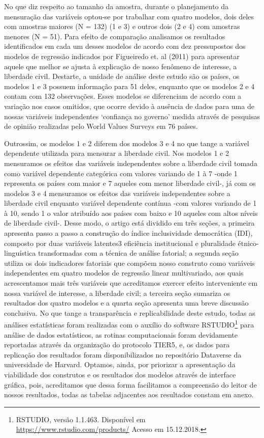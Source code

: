 \documentclass[]{elsarticle} %
\begin{document}
No que diz respeito ao tamanho da amostra, durante o planejamento da
mensuração das variáveis optou-se por trabalhar com quatro modelos, dois
deles com amostras maiores (N = 132) (1 e 3) e outros dois (2 e 4) com
amostras menores (N = 51). Para efeito de comparação analisamos os
resultados identificados em cada um desses modelos de acordo com dez
pressupostos dos modelos de regressão indicados por Figueiredo et. al
(2011) para apresentar aquele que melhor se ajusta à explicação de nosso
fenômeno de interesse, a liberdade civil. Destarte, a unidade de análise
deste estudo são os países, os modelos 1 e 3 possuem informação para 51
deles, enquanto que os modelos 2 e 4 contam com 132 observações. Esses
modelos se diferenciam de acordo com a variação nos casos omitidos, que
ocorre devido à ausência de dados para uma de nossas variáveis
independentes `confiança no governo' medida através de pesquisas de
opinião realizadas pelo World Values Surveys em 76 países.

Outrossim, os modelos 1 e 2 diferem dos modelos 3 e 4 no que tange a
variável dependente utilizada para mensurar a liberdade civil. Nos
modelos 1 e 2 mensuramos os efeitos das variáveis independentes sobre a
liberdade civil tomada como variável dependente categórica com valores
variando de 1 à 7 -onde 1 representa os países com maior e 7 aqueles com
menor liberdade civil-, já com os modelos 3 e 4 mensuramos os efeitos
das variáveis independentes sobre a liberdade civil enquanto variável
dependente contínua -com valores variando de 1 à 10, sendo 1 o valor
atribuído aos países com baixo e 10 aqueles com altos níveis de
liberdade civil-. Desse modo, o artigo está dividido em três seções, a
primeira apresenta passo a passo a construção do índice inclusividade
democrática (IDI), composto por duas variáveis latentes3 eficiência
institucional e pluralidade étnico-linguística transformadas com a
técnica de análise fatorial; a segunda seção utiliza os dois indicadores
fatoriais que compõem nosso construto como variáveis independentes em
quatro modelos de regressão linear multivariado, aos quais acrescentamos
mais três variáveis que acreditamos exercer efeito interveniente em
nossa variável de interesse, a liberdade civil; a terceira seção
sumariza os resultados dos quatro modelos e a quarta seção apresenta uma
breve discussão conclusiva. No que tange a transparência e
replicabilidade deste estudo, todas as análises estatísticas foram
realizadas com o auxílio do software RSTUDIO\footnote{RSTUDIO, versão
  1.1.463. Disponível em \url{https://www.rstudio.com/products/} Acesso
  em 15.12.2018.} para análise de dados estatísticos, as rotinas
computacionais foram devidamente reportadas através da organização do
protocolo TIER5, e, os dados para replicação dos resultados foram
disponibilizados no repositório Dataverse da universidade de Harvard.
Optamos, ainda, por priorizar a apresentação da viabilidade dos
construtos e os resultados dos modelos através de interface gráfica,
pois, acreditamos que dessa forma facilitamos a compreensão do leitor de
nossos resultados, todas as tabelas adjacentes aos resultados constam em
anexo.
\end{document}
